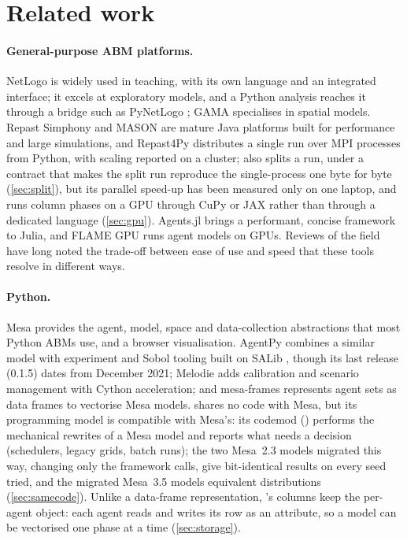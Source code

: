 \section{Related work}
\label{sec:related}

\paragraph{General-purpose ABM platforms.} NetLogo \citep{wilensky1999netlogo} is widely used in
teaching, with its own language and an integrated interface; it excels at exploratory models,
and a Python analysis reaches it through a bridge such as PyNetLogo
\citep{jaxarozen2018pynetlogo}; GAMA \citep{taillandier2019building} specialises in spatial
models. Repast Simphony \citep{north2013repast} and MASON
\citep{luke2005mason} are mature Java platforms built for performance and large simulations,
and Repast4Py \citep{collier2020repast4py} distributes a single run over MPI processes from
Python, with scaling reported on a cluster; \modelly{} also splits a run, under a contract
that makes the split run reproduce the single-process one byte for byte (\cref{sec:split}),
but its parallel speed-up has been measured only on one laptop, and runs column phases on
a GPU through CuPy or JAX rather than through a dedicated language (\cref{sec:gpu}). Agents.jl \citep{datseris2024agents} brings a performant, concise framework to Julia,
and FLAME GPU \citep{richmond2023flamegpu} runs agent models on GPUs. Reviews of the field
\citep{railsback2006agent, abar2017agent} have long noted the trade-off between ease of use and speed that
these tools resolve in different ways.

\paragraph{Python.} Mesa \citep{masad2015mesa, kazil2020mesa, terhoeven2025mesa3} provides the agent, model,
space and data-collection abstractions that most Python ABMs use, and a browser
visualisation. AgentPy \citep{foramitti2021agentpy} combines a similar model with experiment
and Sobol tooling built on SALib \citep{herman2017salib}, though its last release (0.1.5) dates from
December 2021; Melodie \citep{yu2023melodie} adds calibration and scenario management with
Cython acceleration; and mesa-frames \citep{mesaframes} represents agent sets as data frames
to vectorise Mesa models. \modelly{} shares no code with
Mesa, but its programming model is compatible with Mesa's: its
codemod ()
performs the mechanical rewrites of a Mesa model and reports what needs a decision
(schedulers, legacy grids, batch runs); the two Mesa~2.3 models migrated this way, changing only
the framework calls, give bit-identical results on every seed tried, and the migrated Mesa~3.5
models equivalent distributions (\cref{sec:samecode}). Unlike a data-frame representation, \modelly{}'s columns keep
the per-agent object: each agent reads and writes its row as an attribute, so a model can be
vectorised one phase at a time (\cref{sec:storage}).


